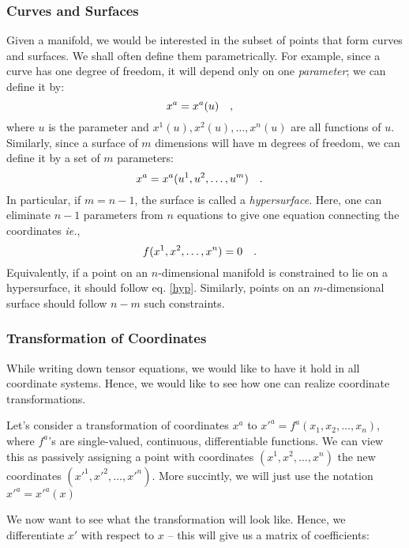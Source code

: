 \documentclass[a4paper,11pt]{article}
\begin{document}
\subsubsection{Curves and Surfaces}
Given a manifold, we would be interested in the subset of points that form curves and surfaces. We shall often define them parametrically. For example, since a curve has one degree of freedom, it will depend only on one \textit{parameter}; we can define it by:
\begin{equation}\label{key}
x^a = x^a(u) \qq{,}
\end{equation}
where $ u $ is the parameter and $ x^1(u), x^2(u), \ldots, x^n(u) $ are all functions of $ u $. Similarly, since a surface of $ m $ dimensions will have m degrees of freedom, we can define it by a set of $ m $ parameters:
\begin{equation}\label{key}
x^a = x^a(u^1, u^2, \ldots, u^m) \qq{.}
\end{equation}
In particular, if $ m=n-1 $, the surface is called a \textit{hypersurface}. Here, one can eliminate $ n-1 $ parameters from $ n $ equations to give one equation connecting the coordinates \textit{ie.},
\begin{equation}\label{hyp}
f(x^1, x^2, \ldots, x^n) = 0 \qq{.}
\end{equation}
Equivalently, if a point on an $ n $-dimensional manifold is constrained to lie on a hypersurface, it should follow eq. \ref{hyp}. Similarly, points on an $ m $-dimensional surface should follow $ n-m $ such constraints.

\subsubsection{Transformation of Coordinates}
While writing down tensor equations, we would like to have it hold in all coordinate systems. Hence, we would like to see how one can realize coordinate transformations.

Let's consider a transformation of coordinates $ x^a $ to $ x'^a =  f^a (x_1, x_2,\ldots, x_n)$, where $ f^a $'s are single-valued, continuous, differentiable functions. We can view this as passively assigning a point with coordinates $ (x^1, x^2,\ldots, x^n) $ the new coordinates $ (x'^1,x'^2, \ldots, x'^n) $. More succintly, we will just use the notation $ x'^a = x'^a(x) $

We now want to see what the transformation will look like. Hence, we differentiate $ x' $ with respect to $ x $ -- this will give us a matrix of coefficients:
\end{document}
